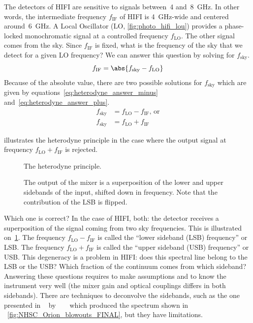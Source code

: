The detectors of HIFI are sensitive to signals between~\num{4} and~\SI{8}{\giga\hertz}.
In other words, the intermediate frequency $f_\text{IF}$ of HIFI is \SI{4}{\giga\hertz}-wide and centered around~\SI{6}{\giga\hertz}.
A Local Oscillator (LO, \cref{fig:photo_hifi_lou}) provides a phase-locked monochromatic signal at a controlled frequency $f_\text{LO}$.
The other signal comes from the sky.
Since $f_\text{IF}$ is fixed, what is the frequency of the sky that we detect for a given LO frequency?
We can answer this question by solving  for $f_\text{sky}$.
\begin{equation}
    f_\text{IF} = \abs{f_\text{sky} - f_\text{LO}} \label{eq:heterodyne_question}
\end{equation}
Because of the absolute value, there are two possible solutions for $f_\text{sky}$ which are given by equations~\eqref{eq:heterodyne_answer_minus} and~\eqref{eq:heterodyne_answer_plus}.
\begin{align}
    f_\text{sky} &= f_\text{LO} - f_\text{IF}
    \text{, or} \label{eq:heterodyne_answer_minus}
    \\
    f_\text{sky} &= f_\text{LO} + f_\text{IF}
    \label{eq:heterodyne_answer_plus}
\end{align}

 illustrates the heterodyne principle in the case where the output signal at frequency $f_\text{LO}+f_\text{IF}$ is rejected.
\begin{figure}[hbtp]
    \centering
    
    \caption{The heterodyne principle.}
    \caption*{
        The output of the mixer is a superposition of the lower and upper sidebands of the input, shifted down in frequency.
        Note that the contribution of the LSB is flipped.}
    \label{fig:heterodyne_principle}
\end{figure}

Which one is correct?
In the case of HIFI, both: the detector receives a superposition of the signal coming from two sky frequencies.
This is illustrated on~\cref{fig:heterodyne_principle}.
The frequency $f_\text{LO} - f_\text{IF}$ is called the ``lower sideband (LSB) frequency'' or LSB.
The frequency $f_\text{LO} + f_\text{IF}$ is called the ``upper sideband (USB) frequency'' or USB.
This degeneracy is a problem in HIFI:
does this spectral line belong to the LSB or the USB?
Which fraction of the continuum comes from which sideband?
Answering these questions requires to make assumptions and to know the instrument very well (the mixer gain and optical couplings differs in both sidebands).
There are techniques to deconvolve%
the sidebands, such as the one presented in%
~ by%
~\citeauthor{comito2002deconvolution}%
~\cite{comito2002deconvolution} which produced the spectrum shown in%
~\cref{fig:NHSC_Orion_blowouts_FINAL}, but they have limitations.


